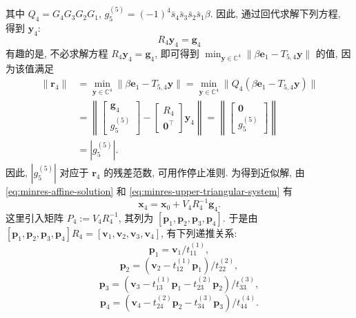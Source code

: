 {其中 $Q_4=G_4G_3G_2G_1$, $g_5^{(5)}=(-1)^4\bar s_4\bar s_3\bar s_2\bar s_1\beta$. 因此, 通过回代求解下列方程, 得到 $\bm y_4$:}
\begin{equation}\label{eq:minres-upper-triangular-system}R_4\bm y_4=\bm g_4\end{equation}
{有趣的是, 不必求解方程 $R_4\bm y_4=\bm g_4$, 即可得到 $\min_{\bm y\in\mathbb C^4}\|\beta\bm e_1-T_{5,4}\bm y\|$ 的值, 因为该值满足}
\[\begin{aligned}
\|\bm r_4\|&=\min_{\bm y\in\mathbb C^4}\|\beta\bm e_1-T_{5,4}\bm y\|
=\min_{\bm y\in\mathbb C^4}\|Q_4(\beta\bm e_1-T_{5,4}\bm y)\|\\
&=\left\|\begin{bmatrix}\bm g_4\\g_5^{(5)}\end{bmatrix}-\begin{bmatrix}R_4\\\bm0^{\top}\end{bmatrix}\bm y_4\right\|
=\left\|\begin{bmatrix}\bm0\\g_5^{(5)}\end{bmatrix}\right\|\\
&=|g_5^{(5)}|.
\end{aligned}\]
{因此, $|g_5^{(5)}|$ 对应于 $\bm r_4$ 的残差范数, 可用作停止准则. 为得到近似解, 由 \eqref{eq:minres-affine-solution} 和 \eqref{eq:minres-upper-triangular-system} 有}
\begin{equation}\label{eq:minres-solution-triangular-inverse}\bm x_4=\bm x_0+V_4R_4^{-1}\bm g_4.\end{equation}
{这里引入矩阵 $P_4:=V_4R_4^{-1}$, 其列为 $[\bm p_1,\bm p_2,\bm p_3,\bm p_4]$. 于是由 $[\bm p_1,\bm p_2,\bm p_3,\bm p_4]R_4=[\bm v_1,\bm v_2,\bm v_3,\bm v_4]$, 有下列递推关系:}
\begin{equation}\label{eq:minres-direction-one}\bm p_1=\bm v_1/t_{11}^{(1)},\end{equation}
\begin{equation}\label{eq:minres-direction-two}\bm p_2=(\bm v_2-t_{12}^{(1)}\bm p_1)/t_{22}^{(2)},\end{equation}
\begin{equation}\label{eq:minres-direction-three}\bm p_3=(\bm v_3-t_{13}^{(1)}\bm p_1-t_{23}^{(2)}\bm p_2)/t_{33}^{(3)},\end{equation}
\begin{equation}\label{eq:minres-direction-four}\bm p_4=(\bm v_4-t_{24}^{(2)}\bm p_2-t_{34}^{(3)}\bm p_3)/t_{44}^{(4)}.\end{equation}
